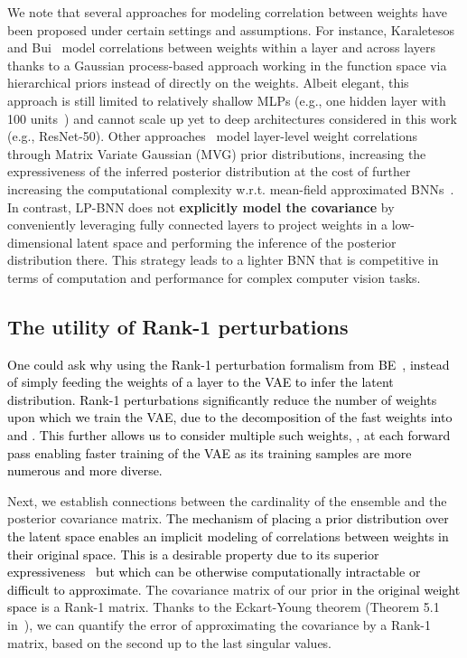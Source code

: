 \documentclass[10pt,twocolumn,letterpaper]{article}
\newcommand{\ab}[1]{\textcolor{black}{#1}}
\begin{document}
We note that several approaches for modeling correlation between weights have been proposed under certain settings and assumptions. For instance, Karaletesos and Bui~\cite{karaletsos2020hierarchical} model correlations between weights within a layer and across layers thanks to a Gaussian process-based approach working in the function space via hierarchical priors instead of directly on the weights. Albeit elegant, this approach is still limited to relatively shallow MLPs (e.g., one hidden layer with 100 units~\cite{karaletsos2020hierarchical}) and cannot scale up yet to deep architectures considered in this work (e.g., ResNet-50).
Other approaches~\cite{louizos2016structured, sun2017learning} 
model layer-level weight correlations through Matrix Variate Gaussian (MVG) prior distributions, increasing the expressiveness of the inferred posterior distribution at the cost of further increasing the computational complexity w.r.t. mean-field approximated BNNs~\cite{blundell2015weight, graves2011practical}.
In contrast, LP-BNN does not \textbf{explicitly model the covariance} by conveniently leveraging fully connected layers to project weights in a low-dimensional latent space and performing the inference of the posterior distribution there. This strategy leads to a lighter BNN that is competitive in terms of computation and performance for complex computer vision tasks.






\subsection{The utility of Rank-1 perturbations }
\label{subsection2appendix}

\ab{One could ask why using the Rank-1 perturbation formalism from BE~\cite{wen2020batchensemble}, instead of simply feeding the weights of a layer to the VAE to infer the latent distribution. Rank-1 perturbations significantly reduce the number of weights upon which we train the VAE, due to the decomposition of the fast weights into  and . This further allows us to consider multiple such weights, , at each forward pass enabling faster training of the VAE as its training samples are more numerous and more diverse.} 

Next, we establish connections between the cardinality  of the ensemble and the posterior covariance matrix.
\ab{The mechanism of placing a prior distribution over the latent space enables an implicit modeling of correlations between weights in their original space. This is a desirable property due to its superior expressiveness~\cite{foong2020expressiveness, karaletsos2020hierarchical} but which can be otherwise computationally intractable or difficult to approximate.} 
The covariance matrix of our prior \ab{in the original weight space} is a Rank-1 matrix. Thanks to the Eckart-Young theorem (Theorem 5.1 in~\cite{wang2012geometric}), we can quantify the error of approximating the covariance by a Rank-1 matrix, based on the second up to the last singular values.
\end{document}
